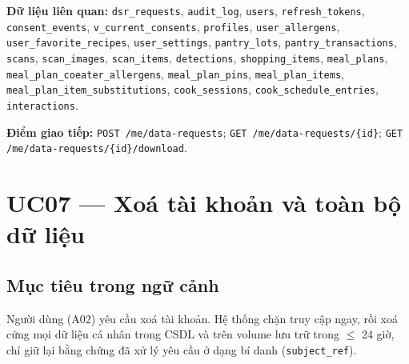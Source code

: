 \textbf{Dữ liệu liên quan:} {\small\texttt{dsr\_\allowbreak{}\allowbreak{}requests}}, {\small\texttt{audit\_\allowbreak{}\allowbreak{}log}}, {\small\texttt{users}}, {\small\texttt{refresh\_\allowbreak{}\allowbreak{}tokens}}, {\small\texttt{consent\_\allowbreak{}\allowbreak{}events}}, {\small\texttt{v\_\allowbreak{}\allowbreak{}current\_\allowbreak{}\allowbreak{}consents}}, {\small\texttt{profiles}}, {\small\texttt{user\_\allowbreak{}\allowbreak{}allergens}}, {\small\texttt{user\_\allowbreak{}\allowbreak{}favorite\_\allowbreak{}\allowbreak{}recipes}}, {\small\texttt{user\_\allowbreak{}\allowbreak{}settings}}, {\small\texttt{pantry\_\allowbreak{}\allowbreak{}lots}}, {\small\texttt{pantry\_\allowbreak{}\allowbreak{}transactions}}, {\small\texttt{scans}}, {\small\texttt{scan\_\allowbreak{}\allowbreak{}images}}, {\small\texttt{scan\_\allowbreak{}\allowbreak{}items}}, {\small\texttt{detections}}, {\small\texttt{shopping\_\allowbreak{}\allowbreak{}items}}, {\small\texttt{meal\_\allowbreak{}\allowbreak{}plans}}, {\small\texttt{meal\_\allowbreak{}\allowbreak{}plan\_\allowbreak{}\allowbreak{}coeater\_\allowbreak{}\allowbreak{}allergens}}, {\small\texttt{meal\_\allowbreak{}\allowbreak{}plan\_\allowbreak{}\allowbreak{}pins}}, {\small\texttt{meal\_\allowbreak{}\allowbreak{}plan\_\allowbreak{}\allowbreak{}items}}, {\small\texttt{meal\_\allowbreak{}\allowbreak{}plan\_\allowbreak{}\allowbreak{}item\_\allowbreak{}\allowbreak{}substitutions}}, {\small\texttt{cook\_\allowbreak{}\allowbreak{}sessions}}, {\small\texttt{cook\_\allowbreak{}\allowbreak{}schedule\_\allowbreak{}\allowbreak{}entries}}, {\small\texttt{interactions}}.

\textbf{Điểm giao tiếp:} {\small\texttt{POST /\allowbreak{}\allowbreak{}me/\allowbreak{}\allowbreak{}data-\allowbreak{}requests}}; {\small\texttt{GET /\allowbreak{}\allowbreak{}me/\allowbreak{}\allowbreak{}data-\allowbreak{}requests/\allowbreak{}\allowbreak{}\{id\}}}; {\small\texttt{GET /\allowbreak{}\allowbreak{}me/\allowbreak{}\allowbreak{}data-\allowbreak{}requests/\allowbreak{}\allowbreak{}\{id\}/\allowbreak{}\allowbreak{}download}}.

\section{UC07 --- Xoá tài khoản và toàn bộ dữ liệu}
\subsection{Mục tiêu trong ngữ cảnh}
Người dùng (A02) yêu cầu xoá tài khoản. Hệ thống chặn truy cập ngay, rồi xoá cứng mọi dữ liệu cá nhân trong CSDL và trên volume lưu trữ trong \ensuremath{\leq} 24 giờ, chỉ giữ lại bằng chứng đã xử lý yêu cầu ở dạng bí danh ({\small\texttt{subject\_\allowbreak{}\allowbreak{}ref}}).

